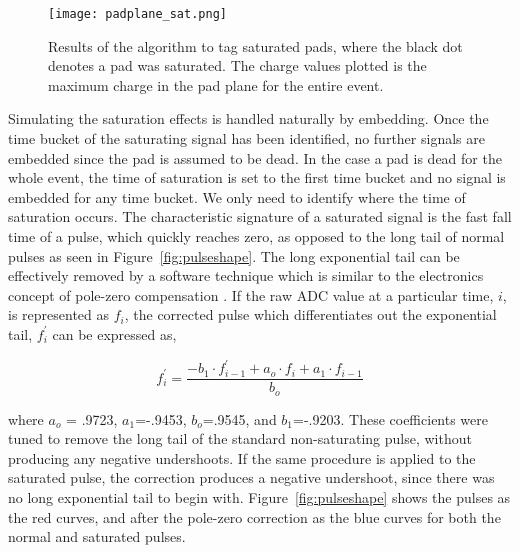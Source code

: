 \begin{figure}[!htb]
\texttt{[image: padplane\_sat.png]}
\caption{Results of the algorithm to tag saturated pads, where the black dot denotes a pad was saturated. The charge values plotted is the maximum charge in the pad plane for the entire event.}
\label{fig:satTag}
\end{figure}

Simulating the saturation effects is handled naturally by embedding. Once the time bucket of the saturating signal has been identified, no further signals are embedded since the pad is assumed to be dead. In the case a pad is dead for the whole event, the time of saturation is set to the first time bucket and no signal is embedded for any time bucket. We only need to identify where the time of saturation occurs. The characteristic signature of a saturated signal is the fast fall time of a pulse, which quickly reaches zero, as opposed to the long tail of normal pulses as seen in Figure~\ref{fig:pulseshape}. The long exponential tail can be effectively removed by a software technique which is similar to the electronics concept of pole-zero compensation \cite{polezero}. If the raw ADC value at a particular time, $i$, is represented as $f_i$, the corrected pulse which differentiates out the exponential tail, $f_i^{'}$ can be expressed as, 

\begin{equation}
f_i^{'} = \frac{-b_1\cdot f_{i-1}^{'} + a_o\cdot f_i + a_1 \cdot f_{i-1}}{b_o}
\label{eq:satpolez}
\end{equation}

where $a_o$ = .9723, $a_1$=-.9453, $b_o$=.9545, and $b_1$=-.9203. These coefficients were tuned to remove the long tail of the standard non-saturating pulse, without producing any negative undershoots. If the same procedure is applied to the saturated pulse, the correction produces a negative undershoot, since there was no long exponential tail to begin with. Figure~\ref{fig:pulseshape} shows the pulses as the red curves, and after the pole-zero correction as the blue curves for both the normal and saturated pulses. 

